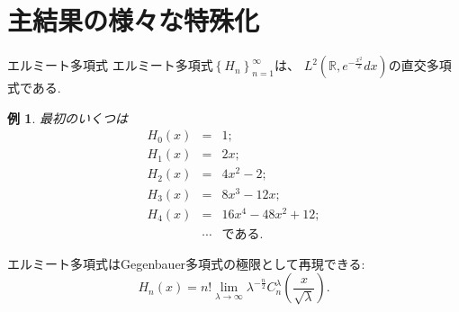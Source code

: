 \documentclass[pdf,notes]{beamer}
\newtheorem*{example*}{例}
\begin{document}
\section{主結果の様々な特殊化}
\begin{frame}{エルミート多項式}
エルミート多項式$\left\{ H_n \right\}_{n=1}^\infty$は、
	$L^2\left( \mathbb{R},e^{-\frac{x^2}{2}}dx \right)$の直交多項式である.
	\begin{example*}
		最初のいくつは
	\vspace{-0.3cm}
		\begin{eqnarray*}
		H_0(x)&=& 1;\\
		H_1(x)&=& 2x;\\
		H_2(x)&=& 
		4x^2-2;\\
		H_3(x)&=& 8x^3-12x;\\
		H_4(x)&=& 16x^4-48x^2+12;\\
		&\cdots&\mbox{である.}
		\end{eqnarray*}
	\end{example*}
	エルミート多項式はGegenbauer多項式の極限として再現できる:
	\begin{equation*}
			H_n (x) = n! \lim_{\lambda \rightarrow \infty} \lambda^{- \frac{n}{2}}
			C_n^{\lambda} \left( \frac{x}{\sqrt{\lambda}} \right).
	\end{equation*}
\end{frame}
\end{document}
